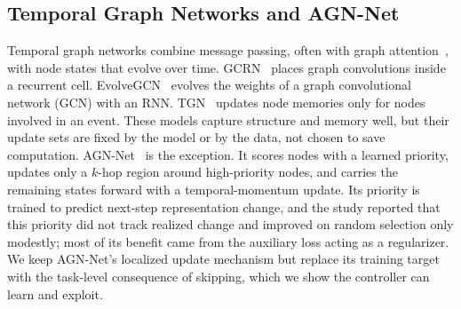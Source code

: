 \subsection{Temporal Graph Networks and AGN-Net}
Temporal graph networks combine message passing, often with graph attention~\cite{velickovic2018graph}, with node states that evolve over time. GCRN~\cite{seo2018structured} places graph convolutions inside a recurrent cell. EvolveGCN~\cite{pareja2020evolvegcn} evolves the weights of a graph convolutional network (GCN) with an RNN. TGN~\cite{rossi2020temporal} updates node memories only for nodes involved in an event. These models capture structure and memory well, but their update sets are fixed by the model or by the data, not chosen to save computation. AGN-Net~\cite{islam2026agnnet} is the exception. It scores nodes with a learned priority, updates only a $k$-hop region around high-priority nodes, and carries the remaining states forward with a temporal-momentum update. Its priority is trained to predict next-step representation change, and the study reported that this priority did not track realized change and improved on random selection only modestly; most of its benefit came from the auxiliary loss acting as a regularizer. We keep AGN-Net's localized update mechanism but replace its training target with the task-level consequence of skipping, which we show the controller can learn and exploit.
